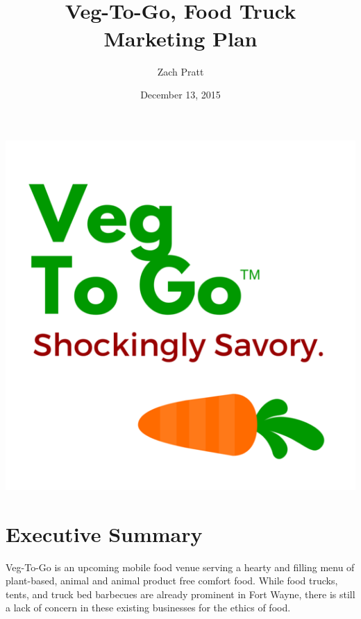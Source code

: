 \documentclass[12pt, letterpaper]{article}
\newcommand{\companyname}{Veg-To-Go}
\begin{document}
\includegraphics{VegToGoLogo}

\newpage{}

\title{\companyname{},\textsuperscript{\texttrademark} Food Truck\\ Marketing Plan}
\author{Zach Pratt}
\date{December 13, 2015}
\maketitle

\newpage

\renewcommand\contentsname{Table of Contents}
\renewcommand{\cftsecleader}{\cftdotfill{\cftdotsep}}
\tableofcontents

\setlength{\parindent}{.5in} %

\newpage

\section{Executive Summary}
\companyname{} is an upcoming mobile food venue serving a hearty and filling menu of plant-based, animal and animal product free comfort food.  While food trucks, tents, and truck bed barbecues are already prominent in Fort Wayne, there is still a lack of concern in these existing businesses for the ethics of food.
\end{document}
